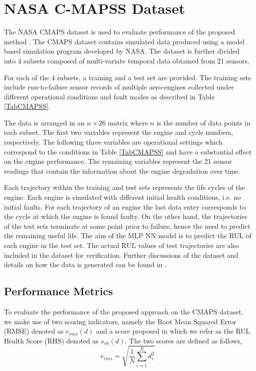 \documentclass[12pt]{IEEEtran}%
\begin{document}
\section{NASA C-MAPSS Dataset}

\label{sec:rul_dataset}

The NASA CMAPS dataset is used to evaluate performance of the proposed method
\cite{CMAPS2008}. The CMAPS dataset contains simulated data produced using a
model based simulation program developed by NASA. The dataset is further
divided into 4 subsets composed of multi-variate temporal data obtained from
21 sensors.

For each of the 4 subsets, a training and a test set are provided. The training
sets include run-to-failure sensor records of multiple aero-engines collected
under different operational conditions and fault modes as described in Table
\ref{TabCMAPSS}.

The data is arranged in an $n\times26$ matrix where $n$ is the number of data
points in each subset. The first two variables represent the engine and cycle
numbers, respectively. The following three variables are operational settings
which correspond to the conditions in Table \ref{TabCMAPSS} and have a
substantial effect on the engine performance. The remaining variables
represent the 21 sensor readings that contain the information about the engine
degradation over time.

Each trajectory within the training and test sets represents the life cycles
of the engine. Each engine is simulated with different initial health
conditions, i.e. no initial faults. For each trajectory of an engine the last
data entry corresponds to the cycle at which the engine is found faulty. On
the other hand, the trajectories of the test sets terminate at some point
prior to failure, hence the need to predict the remaining useful life. The aim
of the MLP NN model is to predict the RUL of each engine in the test set. The
actual RUL values of test trajectories are also included in the dataset for
verification. Further discussions of the dataset and details on how the data
is generated can be found in \cite{Saxena2008}.

\subsection{Performance Metrics}

\label{sec:rul_metrics}

To evaluate the performance of the proposed approach on the CMAPS dataset, we
make use of two scoring indicators, namely the Root Mean Squared Error (RMSE)
denoted as $e_{rms}(d)$ and a score proposed in \cite{Saxena2008} which we
refer as the RUL Health Score (RHS) denoted as $s_{rh}(d)$. The two scores are
defined as follows,
\begin{equation}
e_{rms} = \sqrt{ \frac{1}{N} \sum_{i=1}^{N}{d_{i}^{2}}} \label{eq:rmse}%
\end{equation}
%
\end{document}

